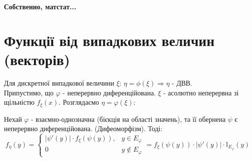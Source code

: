 \begin{center}
	\Huge \textbf{Собственно, матстат...}
\end{center}
\section{Функції від випадкових величин (векторів)}
Для дискретної випадкової величини $\xi$: $\eta = \phi (\xi) \Rightarrow \eta$ - ДВВ. \\
Припустимо, що $\varphi$ - неперервно диференційована. $\xi$ - асолютно неперервна зі щільністю $f_{\xi}(x)$. Розглядаємо $ \eta = \varphi(\xi) $:

\begin{boxteo}
    Нехай $\varphi$ - взаємно-однозначна (бієкція на області значень), та її обернена $\psi$ є неперервно диференційована. (Дифеоморфізм). Тоді:
    $$
    f_{\eta} (y) = \begin{cases}
    \left| \psi '(y) \right| \cdot  f_{\xi }(\psi (y)), & y \in E_{\varphi}\\
        0 & y \notin E_{\varphi}
    \end{cases} = f_{\xi} (\psi (y)) \cdot \left| \psi'(y) \right| \cdot \mathbb{I}_{E_{\varphi}}(y)
    $$
\end{boxteo}


